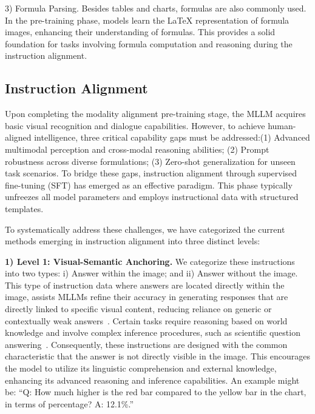 3) Formula Parsing. Besides tables and charts, formulas are also commonly used. In the pre-training phase, models learn the LaTeX representation of formula images, enhancing their understanding of formulas. This provides a solid foundation for tasks involving formula computation and reasoning during the instruction alignment.

\subsection{Instruction Alignment}

Upon completing the modality alignment pre-training stage, the MLLM acquires basic visual recognition and dialogue capabilities. However, to achieve human-aligned intelligence, three critical capability gaps must be addressed:(1) Advanced multimodal perception and cross-modal reasoning abilities; (2) Prompt robustness across diverse formulations; (3) Zero-shot generalization for unseen task scenarios. To bridge these gaps, instruction alignment through supervised fine-tuning (SFT) has emerged as an effective paradigm. This phase typically unfreezes all model parameters and employs instructional data with structured templates. 

To systematically address these challenges, we have categorized the current methods emerging in instruction alignment into three distinct levels:

\noindent \textbf{1) Level 1: Visual-Semantic Anchoring.}  We categorize these instructions into two types: i) Answer within the image; and ii) Answer without the image.
This type of instruction data where answers are located directly within the image, assists MLLMs refine their accuracy in generating responses that are directly linked to specific visual content, reducing reliance on generic or contextually weak answers~\cite{mathew2021docvqa, mathew2022infographicvqa}.
Certain tasks require reasoning based on world knowledge and involve complex inference procedures, such as scientific question answering~\cite{masry2022chartqa,chen2021geoqa}. Consequently, these instructions are designed with the common characteristic that the answer is not directly visible in the image. This encourages the model to utilize its linguistic comprehension and external knowledge, enhancing its advanced reasoning and inference capabilities. An example might be: ``Q: How much higher is the red bar compared to the yellow bar in the chart, in terms of percentage? A: 12.1\%.''


